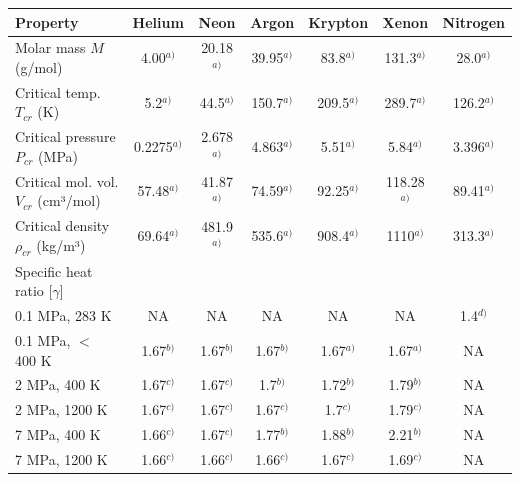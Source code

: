 \documentclass[../main]{subfiles}
\begin{document}
\vspace{0mm}
    \begin{table}[H]
        \centering
       \begin{tabular}{l c c c c c c}
\toprule
            \textbf{Property}     &      \textbf{Helium}     &      \textbf{Neon}          &        \textbf{Argon}    &  \textbf{Krypton} & \textbf{Xenon} & \textbf{Nitrogen}   \\                
\midrule
        \makecell[l]{Molar mass \\ $M$ (g/mol)}       &  4.00$^{a)}$  &   20.18$^{a)}$  &   39.95$^{a)}$ &  83.8$^{a)}$ & 131.3$^{a)}$ & 28.0$^{a)}$ \\
        \makecell[l]{Critical temp. \\ $T_{cr}$ (K)}  & 5.2$^{a)}$  &   44.5$^{a)}$  &   150.7$^{a)}$ & 209.5$^{a)}$ & 289.7$^{a)}$ & 126.2$^{a)}$ \\               
        \makecell[l]{Critical pressure \\ $P_{cr}$ (MPa)} &  0.2275$^{a)}$  &    2.678$^{a)}$  &    4.863$^{a)}$ &  5.51$^{a)}$ & 5.84$^{a)}$ &     3.396$^{a)}$ \\                 
        \makecell[l]{Critical mol. vol. \\ $V_{cr}$ (cm³/mol)}       & 57.48$^{a)}$  &    41.87$^{a)}$  &   74.59$^{a)}$ & 92.25$^{a)}$ & 118.28$^{a)}$ & 89.41$^{a)}$ \\
        \makecell[l]{Critical density    \\ $\rho_{cr}$ (kg/m³)}    & 69.64$^{a)}$  &   481.9$^{a)}$  &    535.6$^{a)}$ & 908.4$^{a)}$ & 1110$^{a)}$ & 313.3$^{a)}$ \\                   
\midrule    
            Specific heat ratio [$\gamma$] &   &   &   &   &   &   \\
            0.1 MPa, 283 K   &  NA & NA  & NA  & NA  &  NA & 1.4$^{d)}$ \\                                  
            0.1 MPa, $<$ 400 K  & 1.67$^{b)}$ & 1.67$^{b)}$ & 1.67$^{b)}$ & 1.67$^{a)}$ & 1.67$^{a)}$ & NA \\
            2 MPa, 400 K     &  1.67$^{c)}$ & 1.67$^{c)}$ & 1.7$^{b)}$  & 1.72$^{b)}$  & 1.79$^{b)}$  & NA \\    
            2 MPa, 1200 K    & 1.67$^{c)}$  & 1.67$^{c)}$  & 1.67$^{c)}$  & 1.7$^{c)}$  & 1.79$^{c)}$  &  NA\\
            7 MPa, 400 K     & 1.66$^{c)}$  &  1.67$^{c)}$ & 1.77$^{b)}$  & 1.88$^{b)}$  & 2.21$^{b)}$  & NA \\
            7 MPa, 1200 K     & 1.66$^{c)}$  & 1.66$^{c)}$  & 1.66$^{c)}$ & 1.67$^{c)}$  &  1.69$^{c)}$   & NA \\

\end{tabular}
\end{table}
\end{document}
